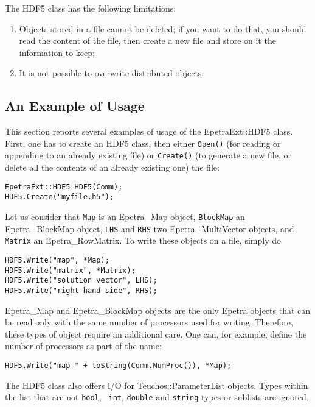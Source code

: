 \documentclass[11pt,relax]{SANDreport}
\begin{document}
The HDF5 class has the following limitations:
\begin{enumerate}
\item Objects stored in a file cannot be deleted; if you want to do that, you should read the
  content of the file, then create a new file and store on it the information to keep;
\item It is not possible to overwrite distributed objects.
\end{enumerate}


\subsection{An Example of Usage}
\label{sec:hdf5:example}

This section reports several examples of usage of the EpetraExt::HDF5 class.
First, one has to create an HDF5 class, then either {\tt Open()}
(for reading or appending to an already existing file) or
{\tt Create()} (to generate a new file, or delete all the contents of an
                already existing one) the file:
\begin{verbatim}
EpetraExt::HDF5 HDF5(Comm);
HDF5.Create("myfile.h5");
\end{verbatim}
Let us consider that {\tt Map} is an Epetra\_Map object, {\tt BlockMap} an
Epetra\_BlockMap object, {\tt LHS} and {\tt RHS} two Epetra\_MultiVector
objects, and {\tt Matrix} an Epetra\_RowMatrix. To write these objects on a
file, simply do
\begin{verbatim}
HDF5.Write("map", *Map);
HDF5.Write("matrix", *Matrix);
HDF5.Write("solution vector", LHS);
HDF5.Write("right-hand side", RHS);
\end{verbatim}
Epetra\_Map and Epetra\_BlockMap objects are the only Epetra objects
that can be read only with the same number of processors used for writing.
Therefore, these types of object require an additional care. One can, for
example, define the number of processors as part of the name:
\begin{verbatim}
HDF5.Write("map-" + toString(Comm.NumProc()), *Map);
\end{verbatim}

The HDF5 class also offers I/O for Teuchos::ParameterList objects. Types
within the list that are not {\tt bool}, {\tt
  int}, {\tt double} and {\tt string} types or sublists are ignored.
\end{document}
